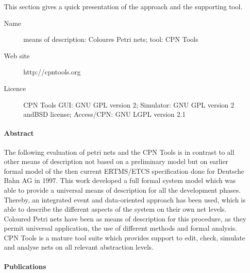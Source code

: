 This section gives a quick presentation of the approach and the supporting tool.

\begin{description}
\item[Name] means of description: Coloures Petri nets; tool: CPN Tools
\item[Web site] http://cpntools.org
\item[Licence] CPN Tools GUI: GNU GPL version 2; Simulator: GNU GPL version 2 andBSD license; Access/CPN: GNU LGPL version 2.1
\end{description}

\paragraph{Abstract} 

The following evaluation of petri nets and the CPN Tools is in contrast to all other means of description not based on a preliminary model but on earlier formal model of the then current ERTMS/ETCS specification done for Deutsche Bahn AG in 1997. This work developed a full formal system model which was able to provide a
universal means of description for all the development phases. Thereby, an integrated event and data-oriented approach has been used, which is able to describe the different aspects of the  system  on  their  own net  levels.  Coloured Petri nets have been as means of description for this procedure, as they permit universal application, the use of different methods and formal analysis. CPN Tools is a mature tool suite which provides support to edit, check, simulate and analyse nets on all relevant abstraction levels.


\paragraph{Publications} 

